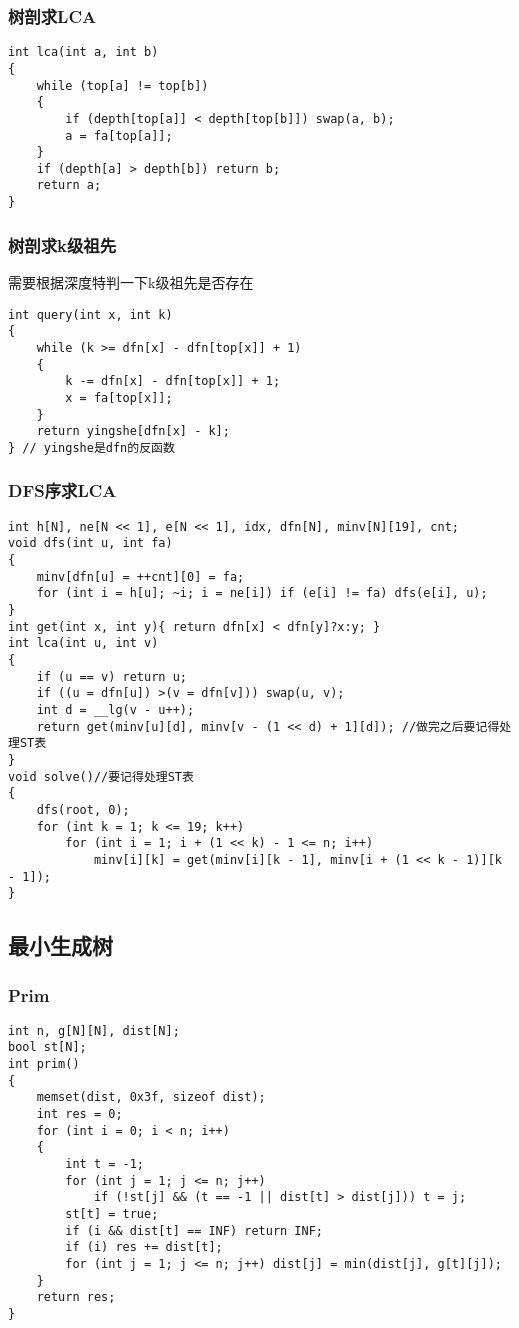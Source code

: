 \documentclass[a4paper, fontset=none]{ctexart}
\begin{document}
\subsubsection{树剖求LCA}
\begin{verbatim}
int lca(int a, int b)
{
    while (top[a] != top[b])
    {
        if (depth[top[a]] < depth[top[b]]) swap(a, b);
        a = fa[top[a]];
    }
    if (depth[a] > depth[b]) return b;
    return a;
}
\end{verbatim}
\subsubsection{树剖求k级祖先}
需要根据深度特判一下k级祖先是否存在
\begin{verbatim}
int query(int x, int k)
{
    while (k >= dfn[x] - dfn[top[x]] + 1)
    {
        k -= dfn[x] - dfn[top[x]] + 1;
        x = fa[top[x]];
    }
    return yingshe[dfn[x] - k];
} // yingshe是dfn的反函数
\end{verbatim}
\subsubsection{DFS序求LCA}
\begin{verbatim}
int h[N], ne[N << 1], e[N << 1], idx, dfn[N], minv[N][19], cnt;
void dfs(int u, int fa)
{
    minv[dfn[u] = ++cnt][0] = fa;
    for (int i = h[u]; ~i; i = ne[i]) if (e[i] != fa) dfs(e[i], u);
}
int get(int x, int y){ return dfn[x] < dfn[y]?x:y; }
int lca(int u, int v)
{
    if (u == v) return u;
    if ((u = dfn[u]) >(v = dfn[v])) swap(u, v);
    int d = __lg(v - u++);
    return get(minv[u][d], minv[v - (1 << d) + 1][d]); //做完之后要记得处理ST表
}
void solve()//要记得处理ST表
{
    dfs(root, 0);
    for (int k = 1; k <= 19; k++)
        for (int i = 1; i + (1 << k) - 1 <= n; i++)
            minv[i][k] = get(minv[i][k - 1], minv[i + (1 << k - 1)][k - 1]);
}
\end{verbatim}
\subsection{最小生成树}
\subsubsection{Prim}
\begin{verbatim}
int n, g[N][N], dist[N];
bool st[N];
int prim()
{
    memset(dist, 0x3f, sizeof dist);
    int res = 0;
    for (int i = 0; i < n; i++)
    {
        int t = -1;
        for (int j = 1; j <= n; j++)
            if (!st[j] && (t == -1 || dist[t] > dist[j])) t = j;
        st[t] = true;
        if (i && dist[t] == INF) return INF;
        if (i) res += dist[t];
        for (int j = 1; j <= n; j++) dist[j] = min(dist[j], g[t][j]);
    }
    return res;
}
\end{verbatim}
\end{document}
